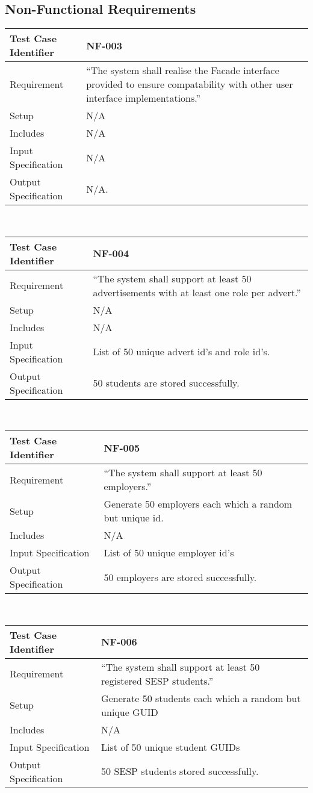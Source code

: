 \documentclass{l3deliverable}
\begin{document}
\subsection{Non-Functional Requirements}

\begin{tabular}{lp{10cm}}
\hline 
\textbf{Test Case Identifier} & NF-003\tabularnewline
\hline 
\hline 
Requirement & ``The system shall realise the Facade interface provided to ensure compatability with other user interface implementations.'' \tabularnewline
\hline 
Setup & N/A \tabularnewline
\hline 
Includes & N/A \tabularnewline
\hline 
Input Specification &  N/A \tabularnewline
\hline 
Output Specification & N/A. \tabularnewline
\hline 
\end{tabular}\\


\begin{tabular}{lp{10cm}}
\hline 
\textbf{Test Case Identifier} & NF-004\tabularnewline
\hline 
\hline 
Requirement & ``The system shall support at least 50 advertisements with at least one role per advert.'' \tabularnewline
\hline 
Setup & N/A \tabularnewline
\hline 
Includes & N/A \tabularnewline
\hline 
Input Specification & List of 50 unique advert id's and role id's. \tabularnewline
\hline 
Output Specification & 50 students are stored successfully. \tabularnewline
\hline 
\end{tabular}\\

\begin{tabular}{lp{10cm}}
\hline 
\textbf{Test Case Identifier} & NF-005\tabularnewline
\hline 
\hline 
Requirement & ``The system shall support at least 50 employers.'' \tabularnewline
\hline 
Setup & Generate 50 employers each which a random but unique id. \tabularnewline
\hline 
Includes & N/A \tabularnewline
\hline 
Input Specification &  List of 50 unique employer id's\tabularnewline
\hline 
Output Specification & 50 employers are stored successfully. \tabularnewline
\hline 
\end{tabular}\\

\begin{tabular}{lp{10cm}}
\hline 
\textbf{Test Case Identifier} & NF-006\tabularnewline
\hline 
\hline 
Requirement & ``The system shall support at least 50 registered SESP students.'' \tabularnewline
\hline 
Setup & Generate 50 students each which a random but unique GUID \tabularnewline
\hline 
Includes & N/A \tabularnewline
\hline 
Input Specification &  List of 50 unique student GUIDs \tabularnewline
\hline 
Output Specification & 50 SESP students stored successfully. \tabularnewline
\hline 
\end{tabular}\\
\end{document}
